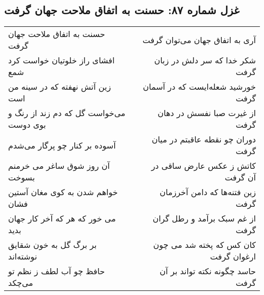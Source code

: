 \begin{center}
\section*{غزل شماره ۸۷: حسنت به اتفاق ملاحت جهان گرفت}
\label{sec:sh087}
\begin{longtable}{l p{0.5cm} r}
حسنت به اتفاق ملاحت جهان گرفت
&&
آری به اتفاق جهان می‌توان گرفت
\\
افشای راز خلوتیان خواست کرد شمع
&&
شکر خدا که سر دلش در زبان گرفت
\\
زین آتش نهفته که در سینه من است
&&
خورشید شعله‌ایست که در آسمان گرفت
\\
می‌خواست گل که دم زند از رنگ و بوی دوست
&&
از غیرت صبا نفسش در دهان گرفت
\\
آسوده بر کنار چو پرگار می‌شدم
&&
دوران چو نقطه عاقبتم در میان گرفت
\\
آن روز شوق ساغر می خرمنم بسوخت
&&
کاتش ز عکس عارض ساقی در آن گرفت
\\
خواهم شدن به کوی مغان آستین فشان
&&
زین فتنه‌ها که دامن آخرزمان گرفت
\\
می خور که هر که آخر کار جهان بدید
&&
از غم سبک برآمد و رطل گران گرفت
\\
بر برگ گل به خون شقایق نوشته‌اند
&&
کان کس که پخته شد می چون ارغوان گرفت
\\
حافظ چو آب لطف ز نظم تو می‌چکد
&&
حاسد چگونه نکته تواند بر آن گرفت
\\
\end{longtable}
\end{center}
